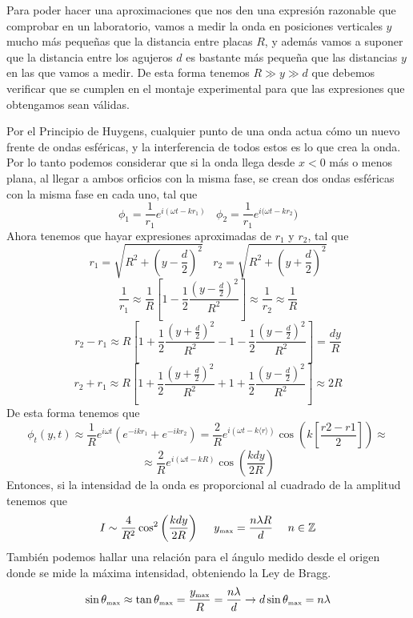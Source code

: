 Para poder hacer una aproximaciones que nos den una expresión razonable que comprobar en un laboratorio, vamos a medir la onda en posiciones verticales $y$ mucho más pequeñas que la distancia entre placas $R$, y además vamos a suponer que la distancia entre los agujeros $d$ es bastante más pequeña que las distancias $y$ en las que vamos a medir. De esta forma tenemos $R \gg y \gg d$ que debemos verificar que se cumplen en el montaje experimental para que las expresiones que obtengamos sean válidas.

Por el Principio de Huygens, cualquier punto de una onda actua cómo un nuevo frente de ondas esféricas, y la interferencia de todos estos es lo que crea la onda. Por lo tanto podemos considerar que si la onda llega desde $x<0$ más o menos plana, al llegar a ambos orficios con la misma fase, se crean dos ondas esféricas con la misma fase en cada uno, tal que
\[\phi_1 = \frac{1}{r_1} e^{i(\omega t -kr_1)} \ \ \ \ \phi_2 = \frac{1}{r_1} e^{i(\omega t -kr_2})\]
Ahora tenemos que hayar expresiones aproximadas de $r_1$ y $r_2$, tal que 
\[r_1=\sqrt{R^2+\left(y-\frac{d}{2}\right)^2} \ \ \ \ r_2=\sqrt{R^2+\left(y+\frac{d}{2}\right)^2}\]
\[\frac{1}{r_1} \approx \frac{1}{R}\left[1-\frac{1}{2} \frac{\left(y-\frac{d}{2}\right)^2}{R^2}\right] \approx \frac{1}{r_2} \approx \frac{1}{R}\]
\[r_2-r_1 \approx R\left[1+\frac{1}{2}\frac{\left(y+\frac{d}{2}\right)^2}{R^2}-1-\frac{1}{2}\frac{\left(y-\frac{d}{2}\right)^2}{R^2}\right]= \frac{dy}{R}\]
\[r_2+r_1 \approx R\left[1+\frac{1}{2}\frac{\left(y+\frac{d}{2}\right)^2}{R^2}+1+\frac{1}{2}\frac{\left(y-\frac{d}{2}\right)^2}{R^2}\right]\approx 2R\]
De esta forma tenemos que 
\[\phi_t (y,t) \approx \frac{1}{R}e^{i\omega t}\left(e^{-ikr_1}+e^{-ikr_2}\right) = \frac{2}{R}e^{i(\omega t-k\langle r\rangle )} \cos\left(k \left[\frac{r2-r1}{2}\right]\right) \approx\]
\begin{equation} \label{6.1.1}
    \approx \frac{2}{R}e^{i(\omega t-kR)} \cos\left(\frac{kdy}{2R}\right)
\end{equation}
Entonces, si la intensidad de la onda es proporcional al cuadrado de la amplitud tenemos que 
\begin{equation} \label{6.1.1}
    I \sim \frac{4}{R^2}\cos^2\left(\frac{kdy}{2R}\right) \ \ \ \ y_{\mbox{\tiny max}} = \frac{n\lambda R}{d} \ \ \ \ n \in \mathbb{Z}
\end{equation}
También podemos hallar una relación para el ángulo medido desde el origen donde se mide la máxima intensidad, obteniendo la Ley de Bragg.
\begin{equation} \label{6.1.1}
    \sin \theta_{\mbox{\tiny max}} \approx \tan \theta_{\mbox{\tiny max}} = \frac{y_{\mbox{\tiny max}}}{R} = \frac{n\lambda}{d} \rightarrow d \sin \theta_{\mbox{\tiny max}} = n\lambda
\end{equation}
